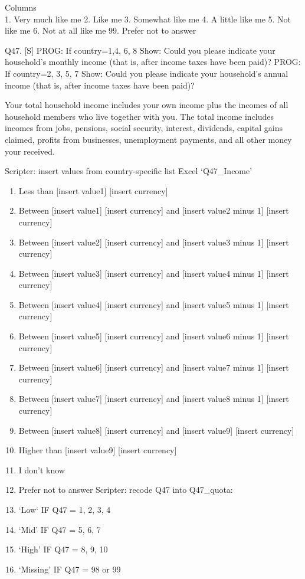 \documentclass[
  12pt,
  a4paper,
]{article}
\providecommand{\tightlist}{%
  \setlength{\itemsep}{0pt}\setlength{\parskip}{0pt}}
\begin{document}
Columns\\
1. Very much like me
2. Like me
3. Somewhat like me
4. A little like me
5. Not like me
6. Not at all like me
99. Prefer not to answer

Q47. {[}S{]} PROG: If country=1,4, 6, 8 Show: Could you please indicate your household's monthly income (that is, after income taxes have been paid)?
PROG: If country=2, 3, 5, 7 Show: Could you please indicate your household's annual income (that is, after income taxes have been paid)?

Your total household income includes your own income plus the incomes of all household members who live together with you. The total income includes incomes from jobs, pensions, social security, interest, dividends, capital gains claimed, profits from businesses, unemployment payments, and all other money your received.

Scripter: insert values from country-specific list Excel `Q47\_Income'

\begin{enumerate}
\def\labelenumi{\arabic{enumi}.}
\tightlist
\item
  Less than {[}insert value1{]} {[}insert currency{]}
\item
  Between {[}insert value1{]} {[}insert currency{]} and {[}insert value2 minus 1{]} {[}insert currency{]}
\item
  Between {[}insert value2{]} {[}insert currency{]} and {[}insert value3 minus 1{]} {[}insert currency{]}
\item
  Between {[}insert value3{]} {[}insert currency{]} and {[}insert value4 minus 1{]} {[}insert currency{]}
\item
  Between {[}insert value4{]} {[}insert currency{]} and {[}insert value5 minus 1{]} {[}insert currency{]}
\item
  Between {[}insert value5{]} {[}insert currency{]} and {[}insert value6 minus 1{]} {[}insert currency{]}
\item
  Between {[}insert value6{]} {[}insert currency{]} and {[}insert value7 minus 1{]} {[}insert currency{]}
\item
  Between {[}insert value7{]} {[}insert currency{]} and {[}insert value8 minus 1{]} {[}insert currency{]}
\item
  Between {[}insert value8{]} {[}insert currency{]} and {[}insert value9{]} {[}insert currency{]}
\item
  Higher than {[}insert value9{]} {[}insert currency{]}
\item
  I don't know
\item
  Prefer not to answer
  Scripter: recode Q47 into Q47\_quota:\\
\item
  `Low` IF Q47 = 1, 2, 3, 4
\item
  `Mid' IF Q47 = 5, 6, 7
\item
  `High' IF Q47 = 8, 9, 10
\item
  `Missing' IF Q47 = 98 or 99
\end{enumerate}
\end{document}
